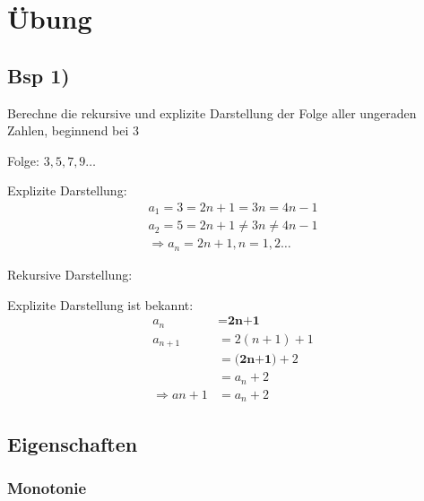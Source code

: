 \documentclass{article}
\begin{document}
    \newpage

    \section{Übung}

    \subsection{Bsp 1)}
    Berechne die rekursive und explizite Darstellung der Folge aller ungeraden Zahlen, beginnend bei 3

    Folge: $3, 5, 7, 9\dots$

    Explizite Darstellung: 
    \begin{gather*}
        a_1 = 3 = 2n+1 = 3n = 4n-1 \\
        a_2 = 5 = 2n+1 \neq 3n \neq 4n-1 \\
        \Rightarrow a_n = 2n+1, n= 1,2\dots
    \end{gather*}

    Rekursive Darstellung:

    Explizite Darstellung ist bekannt:
    \begin{align*}
        a_n &= \textbf{2n+1} \\
        a_{n+1} &= 2(n+1) +1\\
        &= \textbf{(2n+1)} +2 \\
        &= a_n+2\\
        \Rightarrow a{n+1} &=a_n+2
    \end{align*}

    \subsection{Eigenschaften}
    \subsubsection{Monotonie}
\end{document}
